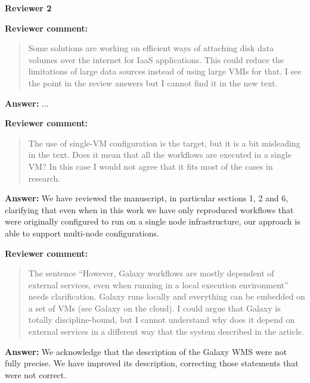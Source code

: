 \documentclass{letter}
\newenvironment{review}%
{\textbf{Reviewer comment:}\begin{quote}}%
{\end{quote}}%
\newcommand{\answer}[1]{%
      \textbf{Answer:} #1}
\newcommand{\revised}[1]{\emph{#1}\color{black}}
\begin{document}
\begin{letter}{}







\newpage

%
%
\textbf{Reviewer 2}


\begin{review}
Some solutions are working on efficient ways of attaching disk data volumes over the internet for IaaS applications. This could reduce the limitations of large data sources instead of using large VMIs for that. I see the point in the review answers but I cannot find it in the new text.
\end{review}

\answer{...}

\begin{review}
The use of single-VM configuration is the target, but it is a bit misleading in the text. Does it mean that all the workflows are executed in a single VM? In this case I would not agree that it fits most of the cases in research.
\end{review}

\answer{We have reviewed the manuscript, in particular sections 1, 2 and 6, clarifying that even when in this work we have only reproduced workflows that were originally configured to run on a single node infrastructure, our approach is able to support multi-node configurations.}

\begin{review}
The sentence ``However, Galaxy workflows are mostly dependent of external services, even when running in a local execution environment'' needs clarification. Galaxy runs locally and everything can be embedded on a set of VMs (see Galaxy on the cloud). I could argue that Galaxy is totally discipline-bound, but I cannot understand why does it depend on external services in a different way that the system described in the article.
\end{review}

\answer{We acknowledge that the description of the Galaxy WMS were not fully precise. We have improved its description, correcting those statements that were not correct.}

\revised{}




\end{letter}
\end{document}
